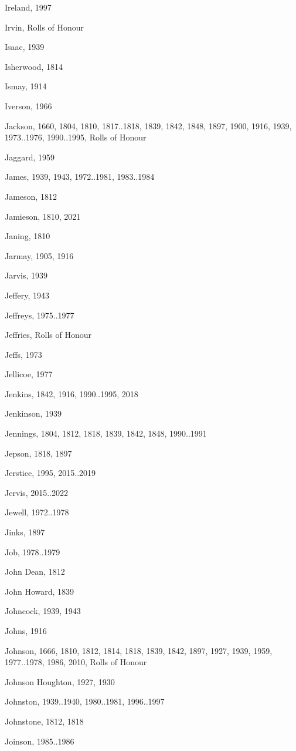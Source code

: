 \begin{theindex}
\item Ireland, 1997
\item Irvin, Rolls of Honour
\item Isaac, 1939
\item Isherwood, 1814
\item Ismay, 1914
\item Iverson, 1966
\item Jackson, 1660, 1804, 1810, 1817..1818, 1839, 1842, 1848, 1897, 1900, 1916, 1939, 1973..1976, 1990..1995, Rolls of Honour
\item Jaggard, 1959
\item James, 1939, 1943, 1972..1981, 1983..1984
\item Jameson, 1812
\item Jamieson, 1810, 2021
\item Janing, 1810
\item Jarmay, 1905, 1916
\item Jarvis, 1939
\item Jeffery, 1943
\item Jeffreys, 1975..1977
\item Jeffries, Rolls of Honour
\item Jeffs, 1973
\item Jellicoe, 1977
\item Jenkins, 1842, 1916, 1990..1995, 2018
\item Jenkinson, 1939
\item Jennings, 1804, 1812, 1818, 1839, 1842, 1848, 1990..1991
\item Jepson, 1818, 1897
\item Jerstice, 1995, 2015..2019
\item Jervis, 2015..2022
\item Jewell, 1972..1978
\item Jinks, 1897
\item Job, 1978..1979
\item John Dean, 1812
\item John Howard, 1839
\item Johncock, 1939, 1943
\item Johns, 1916
\item Johnson, 1666, 1810, 1812, 1814, 1818, 1839, 1842, 1897, 1927, 1939, 1959, 1977..1978, 1986, 2010, Rolls of Honour
\item Johnson Houghton, 1927, 1930
\item Johnston, 1939..1940, 1980..1981, 1996..1997
\item Johnstone, 1812, 1818
\item Joinson, 1985..1986

\end{theindex}
